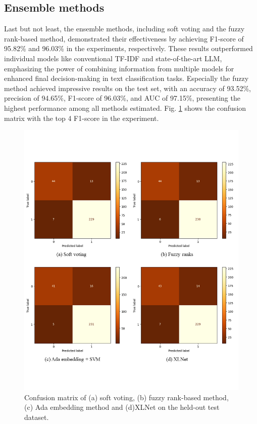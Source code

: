 \subsection{Ensemble methods}
Last but not least, the ensemble methods, including soft voting and the fuzzy rank-based method, demonstrated their effectiveness by achieving F1-score of 95.82\% and 96.03\% in the experiments, respectively. These results outperformed individual models like conventional TF-IDF and state-of-the-art LLM, emphasizing the power of combining information from multiple models for enhanced final decision-making in text classification tasks. Especially the fuzzy method achieved impressive results on the test set, with an accuracy of 93.52\%, precision of 94.65\%, F1-score of 96.03\%, and AUC of 97.15\%, presenting the highest performance among all methods estimated. Fig. \ref{fig:confusion matrix} shows the confusion matrix with the top 4 F1-score in the experiment.
\begin{figure}
    \centering
    \includegraphics[width=1\linewidth]{img/CM4.png}
    \caption{Confusion matrix of (a) soft voting, (b) fuzzy rank-based method, (c) Ada embedding method and (d)XLNet on the held-out test dataset.}
    \label{fig:confusion matrix}
\end{figure}

